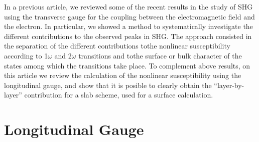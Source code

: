 \documentclass[floatfix,prb,aps,superscriptaddress,11pt,preprint,letterpaper]{revtex4}
\begin{document}
In a previous article,\cite{mendoza_epioptics_2001} we reviewed some
of the recent results in the study of SHG using the transverse gauge
for the coupling between the electromagnetic field and the
electron. In particular, we 
showed a method to systematically investigate the different
contributions to the observed peaks in
SHG.\cite{arzate_microscopic_2001} The approach consisted in the
separation of the different contributions tothe nonlinear
susceptibility according to 1$\omega$ and 2$\omega$ transitions and
tothe  surface or bulk character of the states among which the
transitions take place. To complement above results, on this article
we review the calculation of the nonlinear susceptibility using the
longitudinal gauge, and show that it is posible to clearly obtain the
``layer-by-layer'' contribution for a slab scheme, used for a surface
calculation.

\section{Longitudinal Gauge}\label{longi}
\end{document}
